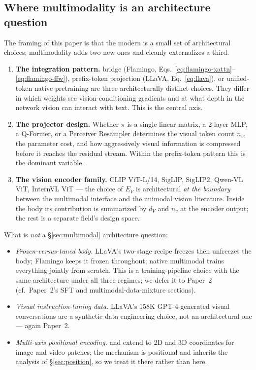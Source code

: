 \subsection{Where multimodality is an architecture question}
\label{sec:multimodal-arch-vs-not}

The framing of this paper is that the modern  is a small
set of architectural choices; multimodality adds two new
ones and cleanly externalizes a third.

\begin{enumerate}
\item \textbf{The integration pattern.}  bridge
(Flamingo, Eqs.~\eqref{eq:flamingo-xattn}--\eqref{eq:flamingo-ffw}),
prefix-token projection (LLaVA, Eq.~\eqref{eq:llava}), or unified-token
native pretraining are three architecturally distinct choices. They
differ in which weights see vision-conditioning gradients and at what
depth in the network vision can interact with text. This is the
central axis.

\item \textbf{The projector design.} Whether $\pi$ is a single linear
matrix, a 2-layer MLP, a Q-Former, or a Perceiver Resampler determines
the visual token count $n_v$, the parameter cost, and how aggressively
visual information is compressed before it reaches the residual
stream. Within the prefix-token pattern this is the dominant variable.

\item \textbf{The vision encoder family.} CLIP ViT-L/14, SigLIP,
SigLIP2, Qwen-VL ViT, InternVL ViT --- the choice of $E_V$ is
architectural \emph{at the boundary} between the multimodal interface
and the unimodal vision literature. Inside the  body its
contribution is summarized by $d_V$ and $n_v$ at the encoder output;
the rest is a separate field's design space.
\end{enumerate}

What is \emph{not} a §\ref{sec:multimodal} architecture question:

\begin{itemize}
\item \emph{Frozen-versus-tuned  body.} LLaVA's two-stage recipe
freezes then unfreezes the  body; Flamingo keeps it frozen
throughout; native multimodal trains everything jointly from scratch.
This is a training-pipeline choice with the same architecture under
all three regimes; we defer it to Paper~2 (cf.\ Paper~2's SFT and
multimodal-data-mixture sections).
\item \emph{Visual instruction-tuning data.} LLaVA's
$158\text{K}$ GPT-4-generated visual conversations
\citep[\S 3]{llava2023} are a synthetic-data engineering choice, not
an architectural one --- again Paper~2.
\item \emph{Multi-axis positional encoding.}  and 
extend  to 2D and 3D coordinates for image and video patches; the
mechanism is positional and inherits the analysis of
\S\ref{sec:position}, so we treat it there rather than here.
\end{itemize}

